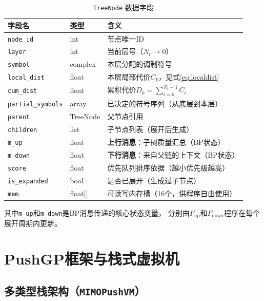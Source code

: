 \documentclass[12pt, a4paper]{ctexart}
\begin{document}
\begin{table}[H]
  \centering
  \caption{\texttt{TreeNode} 数据字段}
  \label{tab:treenode}
  \begin{tabular}{lll}
    \toprule
    字段名 & 类型 & 含义 \\
    \midrule
    \texttt{node\_id}         & int     & 节点唯一ID \\
    \texttt{layer}            & int     & 当前层号（$N_t\to 0$） \\
    \texttt{symbol}           & complex & 本层分配的调制符号 \\
    \texttt{local\_dist}      & float   & 本层局部代价$C_k$，见式\eqref{eq:localdist} \\
    \texttt{cum\_dist}        & float   & 累积代价$D_k=\sum_{i=k}^{N_t-1}C_i$ \\
    \texttt{partial\_symbols} & array   & 已决定的符号序列（从底层到本层） \\
    \texttt{parent}           & TreeNode& 父节点引用 \\
    \texttt{children}         & list    & 子节点列表（展开后生成） \\
    \texttt{m\_up}            & float   & \textbf{上行消息}：子树质量汇总（BP状态） \\
    \texttt{m\_down}          & float   & \textbf{下行消息}：来自父链的上下文（BP状态） \\
    \texttt{score}            & float   & 优先队列排序依据（越小优先级越高） \\
    \texttt{is\_expanded}     & bool    & 是否已展开（生成过子节点） \\
    \texttt{mem}              & float[] & 可读写内存槽（16个，供程序自由使用） \\
    \bottomrule
  \end{tabular}
\end{table}

其中\texttt{m\_up}和\texttt{m\_down}是BP消息传递的核心状态变量，
分别由$F_{\mathrm{up}}$和$F_{\mathrm{down}}$程序在每个展开周期内更新。


\section{PushGP框架与栈式虚拟机}

\subsection{多类型栈架构（\texttt{MIMOPushVM}）}
\end{document}
